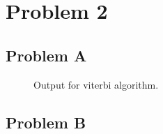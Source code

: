 \documentclass[12pt]{article} %
\begin{document}
\section{Problem 2}

\subsection{Problem A}
\begin{figure}[H]
	\vspace{-10mm}
	\caption{Output for viterbi algorithm.}
\end{figure}

\subsection{Problem B}
\end{document}

